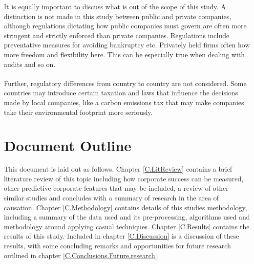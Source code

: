 {\begin{enumerate}
\end{enumerate}
{It is equally important to discuss what is out of the scope of this study. A distinction is not made in this study between public and private companies, although regulations dictating how public companies must govern are often more stringent and strictly enforced than private companies. Regulations include preventative measures for avoiding bankruptcy etc. Privately held firms often how more freedom and flexibility here. This can be especially true when dealing with audits and so on. \\\\
Further, regulatory differences from country to country are not considered. Some countries may introduce certain taxation and laws that influence the decisions made by local companies, like a carbon emissions tax that may make companies take their environmental footprint more seriously.} 
}
\section{Document Outline}
{This document is laid out as follows. Chapter \ref{C.LitReview} contains a brief literature review of this topic including how corporate success can be measured, other predictive corporate features that may be included, a review of other similar studies and concludes with a summary of research in the area of causation. Chapter \ref{C.Methodology} contains details of this studies methodology, including a summary of the data used and its pre-processing, algorithms used and methodology around applying casual techniques. Chapter \ref{C.Results} contains the results of this study. Included in chapter \ref{C.Discussion} is a discussion of these results, with some concluding remarks and opportunities for future research outlined in chapter \ref{C.Conclusions.Future.research}.      }
